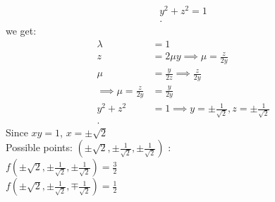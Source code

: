\begin{itemize}
\begin{example}
\begin{align*}
				y^2 + z^2 = 1\\
			.\end{align*}
			we get: 
			\begin{align*}
				\lambda &= 1 \\
				z &= 2\mu y\implies \mu = \frac{z}{2y}\\
				\mu &= \frac{y}{2z} \implies \frac{z}{2y}\\
				\implies \mu = \frac{z}{2y} &= \frac{y}{2y}\\
				y^2 + z^2 &= 1  \implies y = \pm \frac{1}{\sqrt{2} }, z = \pm \frac{1}{\sqrt{2} }\\
			.\end{align*}
			Since $xy = 1$,  $x = \pm \sqrt{2} $\\
			Possible points: $\left( \pm \sqrt{2} , \pm \frac{1}{\sqrt{2} }, \pm \frac{1}{\sqrt{2} } \right) $ :\\
			$f\left( \pm \sqrt{2} , \pm \frac{1}{\sqrt{2} }, \pm \frac{1}{\sqrt{2} } \right)  = \frac{3}{2}$\\
			$f\left( \pm \sqrt{2} , \pm \frac{1}{\sqrt{2} }, \mp \frac{1}{\sqrt{2} } \right)  = \frac{1}{2}$
		\end{example}
\end{itemize}
